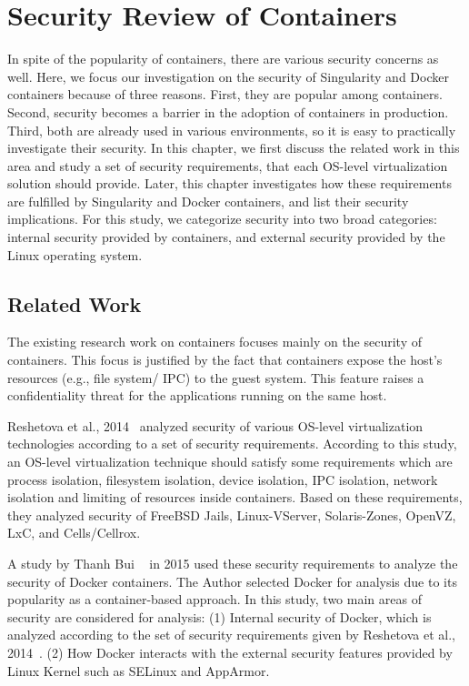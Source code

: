 \chapter{Security Review of Containers}\label{chapter2}	

In spite of the popularity of containers, there are various security
concerns as well. Here, we focus our investigation on the security
of Singularity and Docker containers because of three reasons.
First, they are popular among containers.
Second, security becomes a barrier in the adoption of containers in
production. Third, both are already
used in various environments, so it is easy to practically
investigate their security. 
In this chapter, we first discuss the related work in this area
and study a set of security
requirements, that each OS-level virtualization solution should provide.
Later, this chapter investigates how these requirements are fulfilled
by Singularity and Docker containers, and list their security implications.
For this study, we categorize security into two broad categories: internal
security provided by containers, and external security
provided by the Linux operating system.

\section{Related Work}

The existing research work on containers focuses mainly on the security of containers.
This focus is justified by the fact that containers expose the host's resources
(e.g., file system/ IPC) to the guest system. This feature raises a confidentiality
threat for the applications running on the same host. 

Reshetova et al., 2014~\cite{reshetova2014security} analyzed security of 
various OS-level virtualization technologies
according to a set of security requirements.
According to this study, an OS-level virtualization technique should satisfy
some requirements which are process isolation, filesystem isolation, device isolation,
IPC isolation, network isolation and limiting of resources inside containers.
Based on these requirements, they analyzed
security of FreeBSD Jails, Linux-VServer,
Solaris-Zones, OpenVZ, LxC, and Cells/Cellrox. 

A study by Thanh Bui ~\cite{bui2015analysis} in 2015 used these 
security requirements to analyze the security of Docker containers.
The Author selected Docker for analysis due to its popularity as a container-based approach.
In this study, two main areas of security are considered for analysis:
\newline
(1) Internal security of Docker, which is analyzed according to the
set of security requirements given by Reshetova et al., 2014~\cite{reshetova2014security}.
\newline
(2) How Docker interacts with the external security features provided
by Linux Kernel such as SELinux and AppArmor.


